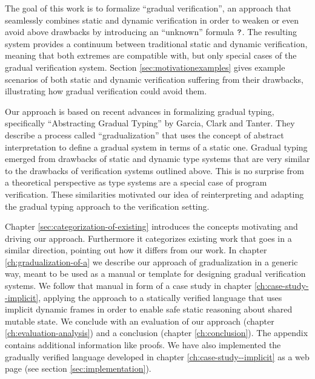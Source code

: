 The goal of this work is to formalize “gradual verification”, an approach that seamlessly combines static and dynamic verification in order to weaken or even avoid above drawbacks by introducing an “unknown” formula $\textup{\texttt{?}}$.
The resulting system provides a continuum between traditional static and dynamic verification, meaning that both extremes are compatible with, but only special cases of the gradual verification system.
Section \ref{sec:motivationexamples} gives example scenarios of both static and dynamic verification suffering from their drawbacks, illustrating how gradual verification could avoid them.

Our approach is based on recent advances in formalizing gradual typing, specifically “Abstracting Gradual Typing” \cite{garcia2016abstracting} by Garcia, Clark and Tanter.
They describe a process called “gradualization” that uses the concept of abstract interpretation to define a gradual system in terms of a static one.
Gradual typing emerged from drawbacks of static and dynamic type systems that are very similar to the drawbacks of verification systems outlined above.
This is no surprise from a theoretical perspective as type systems are a special case of program verification. 
These similarities motivated our idea of reinterpreting and adapting the gradual typing approach to the verification setting.

Chapter \ref{sec:categorization-of-existing} introduces the concepts motivating and driving our approach.
Furthermore it categorizes existing work that goes in a similar direction, pointing out how it differs from our work.
In chapter \ref{ch:gradualization-of-a} we describe our approach of gradualization in a generic way, meant to be used as a manual or template for designing gradual verification systems.
We follow that manual in form of a case study in chapter \ref{ch:case-study--implicit}, applying the approach to a statically verified language that uses implicit dynamic frames in order to enable safe static reasoning about shared mutable state.
We conclude with an evaluation of our approach (chapter \ref{ch:evaluation-analysis}) and a conclusion (chapter \ref{ch:conclusion}).
The appendix contains additional information like proofs. %
We have also implemented the gradually verified language developed in chapter \ref{ch:case-study--implicit} as a web page (see section \ref{sec:implementation}).

